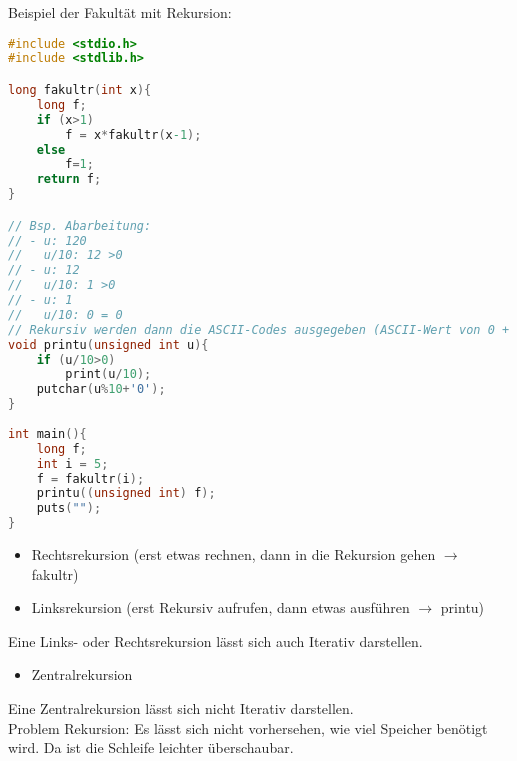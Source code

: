 Beispiel der Fakultät mit Rekursion:
\begin{lstlisting}[language=C]
#include <stdio.h>
#include <stdlib.h>

long fakultr(int x){
	long f;
	if (x>1) 
		f = x*fakultr(x-1);
	else 
		f=1;
	return f;
}

// Bsp. Abarbeitung:
// - u: 120
//   u/10: 12 >0
// - u: 12 
//   u/10: 1 >0
// - u: 1
//   u/10: 0 = 0
// Rekursiv werden dann die ASCII-Codes ausgegeben (ASCII-Wert von 0 + Zahl)
void printu(unsigned int u){
	if (u/10>0)
		print(u/10);
	putchar(u%10+'0');
}
	
int main(){
	long f;
	int i = 5;
	f = fakultr(i);
	printu((unsigned int) f);
	puts("");
}
\end{lstlisting}
\begin{itemize}
\item Rechtsrekursion (erst etwas rechnen, dann in die Rekursion gehen $\rightarrow$ fakultr)
\item Linksrekursion (erst Rekursiv aufrufen, dann etwas ausführen $\rightarrow$ printu)
\end{itemize}
Eine Links- oder Rechtsrekursion lässt sich auch Iterativ darstellen.
\begin{itemize}
\item Zentralrekursion
\end{itemize}
Eine Zentralrekursion lässt sich nicht Iterativ darstellen.\medskip\\
Problem Rekursion: Es lässt sich nicht vorhersehen, wie viel Speicher benötigt wird. Da ist die Schleife leichter überschaubar.
